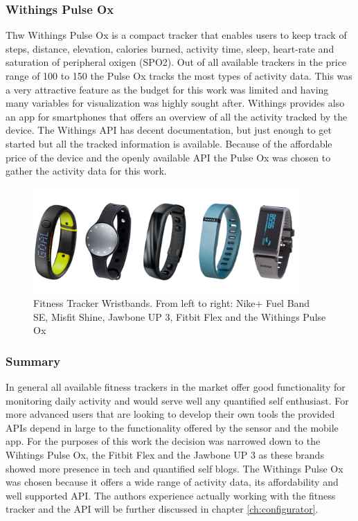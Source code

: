 \documentclass[../medieninformatik-arbeit.tex]{subfiles}
\begin{document}
\subsubsection*{Withings Pulse Ox}
Thw Withings Pulse Ox\cite{withingsProduct} is a compact tracker that enables users to keep track of steps, distance, elevation, calories burned, activity time, sleep, heart-rate and saturation of peripheral oxigen (SPO2). Out of all available trackers in the price range of \EUR{}100 to \EUR{}150 the Pulse Ox tracks the most types of activity data. This was a very attractive feature as the budget for this work was limited and having many variables for visualization was highly sought after. Withings provides also an app for smartphones that offers an overview of all the activity tracked by the device. The Withings API\cite{withingsApi} has decent documentation, but just enough to get started but all the tracked information is available. Because of the affordable price of the device and the openly available API the Pulse Ox was chosen to gather the activity data for this work.

\begin{figure}[h]
\captionsetup{width=0.9\textwidth}
\begin{center}
  \includegraphics[width=0.9\textwidth]{RelatedWork/img/bracelets}
  \caption{Fitness Tracker Wristbands. From left to right: Nike+ Fuel Band SE\cite{nikePlusFuelBand}, Misfit Shine\cite{misfitShine}, Jawbone UP 3\cite{jawboneUpProduct}, Fitbit Flex\cite{fitbitProduct} and the Withings Pulse Ox\cite{withingsProduct}}
\label{fig:bracelets}
\end{center}
\end{figure}

\subsubsection*{Summary}
In general all available fitness trackers in the market offer good functionality for monitoring daily activity and would serve well any quantified self enthusiast. For more advanced users that are looking to develop their own tools the provided APIs depend in large to the functionality offered by the sensor and the mobile app. For the purposes of this work the decision was narrowed down to the Wihtings Pulse Ox, the Fitbit Flex and the Jawbone UP 3 as these brands showed more presence in tech and quantified self blogs. The Withings Pulse Ox was chosen because it offers a wide range of activity data, its affordability and well supported API. The authors experience actually working with the fitness tracker and the API will be further discussed in chapter \ref{ch:configurator}.
\end{document}
